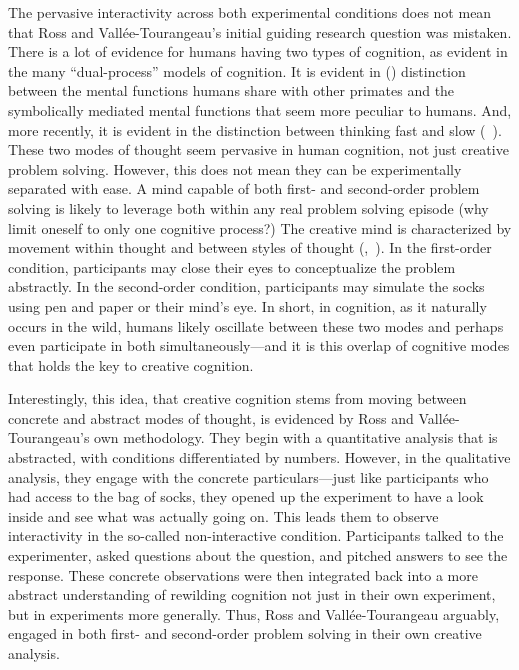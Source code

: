 \documentclass[twocolumn, serif, reflection, authordate]{jote-article}
\begin{document}
The pervasive interactivity across both experimental conditions does not
mean that Ross and Vallée-Tourangeau's initial guiding research question
was mistaken. There is a lot of evidence for humans having two types of
cognition, as evident in the many ``dual-process'' models of cognition.
It is evident in  (\citeyear{Vygotsky1994}) distinction between the
mental functions humans share with other primates and the symbolically
mediated mental functions that seem more peculiar to humans. And, more
recently, it is evident in the distinction between thinking fast and
slow (~\citeyear{Kahneman2011}). These two modes of thought seem pervasive in
human cognition, not just creative problem solving. However, this does
not mean they can be experimentally separated with ease. A mind capable
of both first- and second-order problem solving is likely to leverage
both within any real problem solving episode (why limit oneself to only
one cognitive process?) The creative mind is characterized by movement
within thought and between styles of thought (,~\citeyear{Gillespie2013}). In the first-order condition, participants may close their eyes
to conceptualize the problem abstractly. In the second-order condition,
participants may simulate the socks using pen and paper or their mind's
eye. In short, in cognition, as it naturally occurs in the wild, humans
likely oscillate between these two modes and perhaps even participate in
both simultaneously---and it is this overlap of cognitive modes that
holds the key to creative cognition.

Interestingly, this idea, that creative cognition stems from moving
between concrete and abstract modes of thought, is evidenced by Ross and
Vallée-Tourangeau's own methodology. They begin with a quantitative
analysis that is abstracted, with conditions differentiated by numbers.
However, in the qualitative analysis, they engage with the concrete
particulars---just like participants who had access to the bag of socks,
they opened up the experiment to have a look inside and see what was
actually going on. This leads them to observe interactivity in the
so-called non-interactive condition. Participants talked to the
experimenter, asked questions about the question, and pitched answers to
see the response. These concrete observations were then integrated back
into a more abstract understanding of rewilding cognition not just in
their own experiment, but in experiments more generally. Thus, Ross and
Vallée-Tourangeau arguably, engaged in both first- and second-order
problem solving in their own creative analysis.
\end{document}
